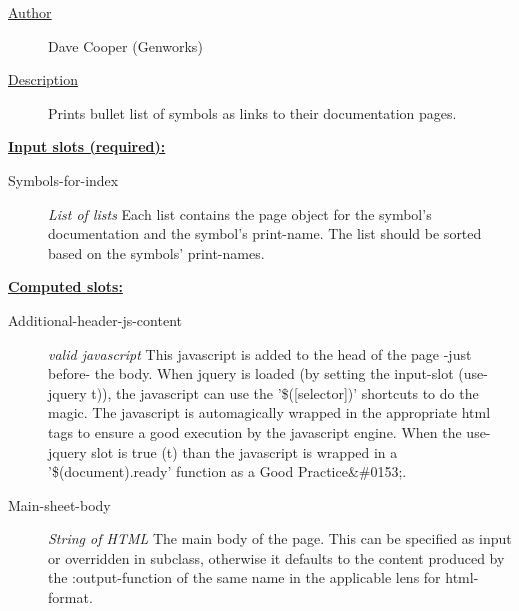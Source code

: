 \documentclass [11pt]{book}
\begin{document}
\begin{itemize}
\begin{description}

\item [
\underline{Author}]


Dave Cooper (Genworks)



\item [
\underline{Description}]


Prints bullet list of symbols as links to their documentation pages.



\end{description}








\textbf{
\underline{Input slots (required):}}

\begin{description}

\item [Symbols-for-index]
\emph{List of lists} Each list contains the page object for the symbol's
documentation and the symbol's print-name. The list should be sorted
based on the symbols' print-names.


\end{description}






\textbf{
\underline{Computed slots:}}

\begin{description}

\item [Additional-header-js-content]
\emph{valid javascript} This javascript is added to the head of the page -just before- the body.
When jquery is loaded (by setting the input-slot (use-jquery t)), the javascript can use the
'\$([selector])' shortcuts to do the magic. The javascript is automagically wrapped in the
appropriate html tags to ensure a good execution by the javascript engine. When the use-jquery
slot is true (t) than the javascript is wrapped in a '\$(document).ready' function as a
Good Practice&\#0153;.


\item [Main-sheet-body]
\emph{String of HTML} The main body of the page.
This can be specified as input or overridden in subclass, otherwise it defaults
to the content produced by the :output-function of the same name
in the applicable lens for  html-format.



\end{description}
\end{itemize}
\end{document}
